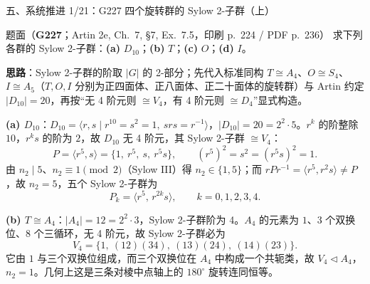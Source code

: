 \documentclass[aspectratio=169,10pt,fontset=none]{ctexbeamer}
\newcommand{\ex}[1]{\textcolor{accent}{\footnotesize\bfseries #1}}
\newcommand{\key}[1]{\textcolor{ink}{\bfseries #1}}
\begin{document}
\begin{frame}[t]{五、系统推进 1/21：G227 四个旋转群的 Sylow 2-子群（上）}
\label{ex:G227}
\scriptsize
\begin{block}{\footnotesize 题面（\ex{G227}；Artin 2e, Ch.~7, §7, Ex.~7.5，印刷 p.~224 / PDF p.~236）}
求下列各群的 Sylow 2-子群：\textbf{(a)} $D_{10}$；\textbf{(b)} $T$；\textbf{(c)} $O$；\textbf{(d)} $I$。
\end{block}
\key{思路}：Sylow 2-子群的阶取 $|G|$ 的 2-部分；先代入标准同构 $T\cong A_4$、$O\cong S_4$、$I\cong A_5$（$T,O,I$ 分别为正四面体、正八面体、正二十面体的旋转群）与 Artin 约定 $|D_{10}|=20$，再按“无 4 阶元则 $\cong V_4$，有 4 阶元则 $\cong D_4$”显式构造。

\key{(a) $D_{10}$}：$D_{10}=\langle r,s\mid r^{10}=s^2=1,\ srs=r^{-1}\rangle$，$|D_{10}|=20=2^2\cdot5$。$r^k$ 的阶整除 $10$，$r^ks$ 的阶为 $2$，故 $D_{10}$ 无 4 阶元，其 Sylow 2-子群 $\cong V_4$：
\[ P=\langle r^5,s\rangle=\{1,\ r^5,\ s,\ r^5s\},\qquad (r^5)^2=s^2=(r^5s)^2=1. \]
由 $n_2\mid5$、$n_2\equiv1\pmod2$（Sylow III）得 $n_2\in\{1,5\}$；而 $rPr^{-1}=\langle r^5,r^2s\rangle\ne P$，故 $n_2=5$，五个 Sylow 2-子群为
\[ P_k=\langle r^5,\,r^{2k}s\rangle,\qquad k=0,1,2,3,4. \]

\key{(b) $T\cong A_4$}：$|A_4|=12=2^2\cdot3$，Sylow 2-子群阶为 4。$A_4$ 的元素为 $1$、$3$ 个双换位、$8$ 个三循环，无 4 阶元，故 Sylow 2-子群必为
\[ V_4=\{1,\ (12)(34),\ (13)(24),\ (14)(23)\}. \]
它由 $1$ 与三个双换位组成，而三个双换位在 $A_4$ 中构成一个共轭类，故 $V_4\triangleleft A_4$，$n_2=1$。几何上这是三条对棱中点轴上的 $180^\circ$ 旋转连同恒等。
\end{frame}
\end{document}

